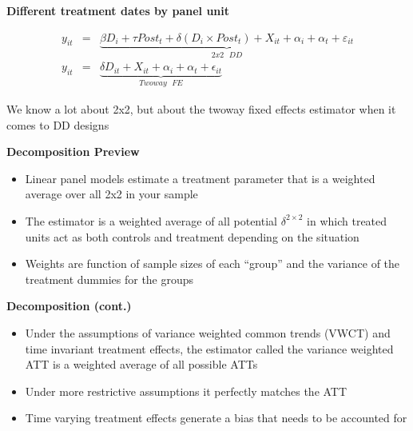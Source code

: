 \documentclass[notes=show]{beamer}
\begin{document}
\begin{frame}[plain]
\begin{center}
\textbf{Different treatment dates by panel unit}
\end{center}

\begin{eqnarray*}
y_{it} &=& \underbrace{\beta D_{i} + \tau Post_{t} + \delta (D_i \times Post_t) + X_{it} + \alpha_i + \alpha_t+ \varepsilon_{it}}_{2x2 \text{ }DD} \\
y_{it} &=& \underbrace{ \delta D_{it} + X_{it} + \alpha_i + \alpha_t + \epsilon_{it}}_{Twoway\text{ }FE}
\end{eqnarray*}

 We know a lot about 2x2, but about the twoway fixed effects estimator when it comes to DD designs

\end{frame}



\begin{frame}[plain]
\begin{center}
\textbf{Decomposition Preview}
\end{center}

\begin{itemize}
\item Linear panel models estimate a treatment parameter that is a weighted average over all 2x2 in your sample
\item The estimator is a weighted average of all potential $\delta^{2\times 2}$ in which treated units act as both controls and treatment depending on the situation
\item Weights are function of sample sizes of each ``group'' and the variance of the treatment dummies for the groups
\end{itemize}

\end{frame}

\begin{frame}[plain]
\begin{center}
\textbf{Decomposition (cont.)}
\end{center}

\begin{itemize}
\item Under the assumptions of variance weighted common trends (VWCT) and time invariant treatment effects, the estimator called the variance weighted ATT is a weighted average of all possible ATTs
\item Under more restrictive assumptions it perfectly matches the ATT
\item Time varying treatment effects generate a bias that needs to be accounted for
\end{itemize}

\end{frame}
\end{document}
